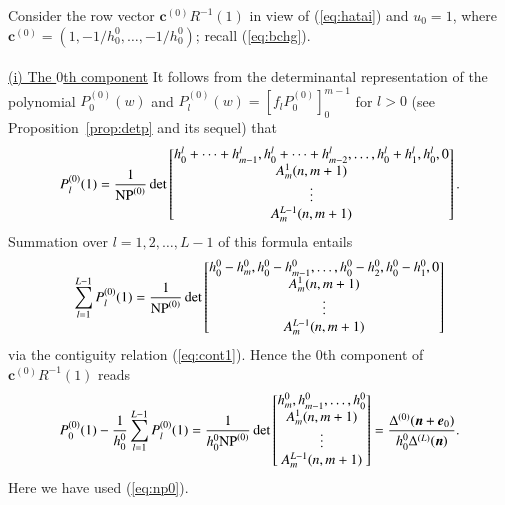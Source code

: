 \documentclass[12pt]{article}
\numberwithin{equation}{section}
\begin{document}
Consider the row vector
${\boldsymbol c}^{(0)} R^{-1}(1)$
in view of (\ref{eq:hatai}) and $u_0=1$,
where
${\boldsymbol c}^{(0)}= (1,-1/h^0_0,\ldots,-1/h^0_0) $;
recall (\ref{eq:bchg}).


\paragraph{}
\underline{(i) The $0$th component}
\quad 
It follows from the determinantal representation of 
the polynomial
$P_0^{(0)}(w)$
and 
$P_l^{(0)}(w)
= 
\left[
 f_l P_0^{(0)}
\right]^{m-1}_{0}$
for $l > 0$
(see Proposition~\ref{prop:detp} and its sequel)
that
\[
P_l^{(0)}(1)
=
\frac{1}{ {\rm NP}^{(0)} }
\det 
\begin{bmatrix}
h_0^l +\cdots+h_{m-1}^l, 
h_0^l +\cdots+h_{m-2}^l, 
 \ldots,  
h_0^l +h_{1}^l, 
h_0^l,  
0 
\\
A^1_{m}(n,m+1) 
\\
\vdots
\\
A^{L-1}_{m}(n,m+1) 
\end{bmatrix}.
\]
Summation over $l=1,2, \ldots,L-1$ 
of this formula entails
\[
\sum_{l=1}^{L-1}
P_l^{(0)}(1)
=
\frac{1}{ {\rm NP}^{(0)} }
\det 
\begin{bmatrix}
h^0_0-h^0_m, 
h^0_0-h^0_{m-1}, 
 \ldots,  
h^0_0 -h^0_2, 
h^0_0-h^0_1,  
0 
\\
A^1_{m}(n,m+1) 
\\
\vdots
\\
A^{L-1}_{m}(n,m+1) 
\end{bmatrix}
\]
via the contiguity relation (\ref{eq:cont1}).
Hence the $0$th component of 
${\boldsymbol c}^{(0)} R^{-1}(1)$
reads
\begin{equation}
\label{eq:p01}
P^{(0)}_0(1)-\frac{1}{h^0_0} \sum_{l=1}^{L-1} P^{(0)}_l(1)
=
\frac{1}{h^0_0  {\rm NP}^{(0)} }
\det 
\begin{bmatrix}
h^0_m,h^0_{m-1}, \ldots, h^0_0
\\
A^1_{m}(n,m+1) 
\\
\vdots
\\
A^{L-1}_{m}(n,m+1) 
\end{bmatrix}
=
\frac{  \Delta^{(0)}({\boldsymbol n}+{\boldsymbol e}_0)}{h^0_0  \Delta^{(L)}({\boldsymbol n}) }.
\end{equation}
Here we have used (\ref{eq:np0}).
\end{document}
